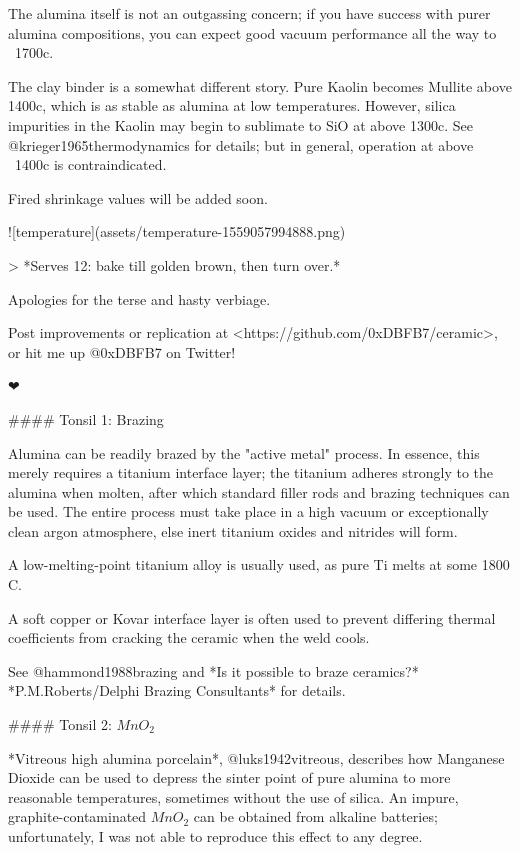 \documentclass[fleqn,10pt]{article}
\begin{document}
The alumina itself is not an outgassing concern; if you have success with purer alumina compositions, you can expect good vacuum performance all the way to ~1700c. 

The clay binder is a somewhat different story. Pure Kaolin becomes Mullite above 1400c, which is as stable as alumina at low temperatures. However, silica impurities in the Kaolin may begin to sublimate to SiO at above 1300c. See @krieger1965thermodynamics for details; but in general, operation at above ~1400c is contraindicated.

Fired shrinkage values will be added soon.



![temperature](assets/temperature-1559057994888.png)

> *Serves 12: bake till golden brown, then turn over.*



Apologies for the terse and hasty verbiage.

Post improvements or replication at <https://github.com/0xDBFB7/ceramic>, or hit me up @0xDBFB7 on Twitter!

❤





#### Tonsil 1: Brazing

Alumina can be readily brazed by the "active metal" process. In essence, this merely requires a titanium interface layer; the titanium adheres strongly to the alumina when molten, after which standard filler rods and brazing techniques can be used. The entire process must take place in a high vacuum or exceptionally clean argon atmosphere, else inert titanium oxides and nitrides will form. 

A low-melting-point titanium alloy is usually used, as pure Ti melts at some 1800 C. 

A soft copper or Kovar interface layer is often used to prevent differing thermal coefficients from cracking the ceramic when the weld cools. 

See @hammond1988brazing and *Is it possible to braze ceramics?* *P.M.Roberts/Delphi Brazing Consultants* for details.

#### Tonsil 2: $MnO_2$

*Vitreous high alumina porcelain*, @luks1942vitreous, describes how Manganese Dioxide can be used to depress the sinter point of pure alumina to more reasonable temperatures, sometimes without the use of silica. An impure, graphite-contaminated $MnO_2$ can be obtained from alkaline batteries; unfortunately, I was not able to reproduce this effect to any degree.
\end{document}
